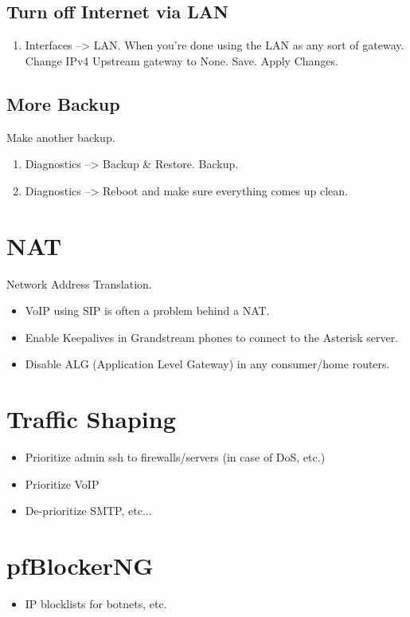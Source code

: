 \subsection{Turn off Internet via LAN}
\begin{enumerate}
 \item Interfaces --> LAN. When you're done using the LAN as any sort of gateway. Change IPv4 Upstream gateway to None. Save. Apply Changes.
\end{enumerate}

\subsection{More Backup}
Make another backup.

\begin{enumerate}
 \item Diagnostics --> Backup \& Restore. Backup.
 \item Diagnostics --> Reboot and make sure everything comes up clean.
\end{enumerate}


\section{NAT}
Network Address Translation.

\begin{itemize}
 \item VoIP using SIP is often a problem behind a NAT.
 \item Enable Keepalives in Grandstream phones to connect to the Asterisk server.
 \item Disable ALG (Application Level Gateway) in any consumer/home routers.
\end{itemize}


\section{Traffic Shaping}
\begin{itemize}
 \item Prioritize admin ssh to firewalls/servers (in case of DoS, etc.)
 \item Prioritize VoIP
 \item De-prioritize SMTP, etc...
\end{itemize}

\section{pfBlockerNG}
\begin{itemize}
 \item IP blocklists for botnets, etc.
\end{itemize}



